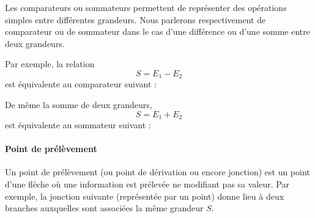 Les comparateurs ou sommateurs permettent de représenter des opérations 
simples entre différentes grandeurs.
Nous parlerons respectivement de comparateur ou de sommateur dans le cas 
d'une différence ou d'une somme entre deux grandeurs. 


Par exemple, la relation 
$$
S = E_1-E_2 
$$
est équivalente au comparateur suivant :
\begin{center}
\end{center}

De même la somme de deux grandeurs,
$$                                                                                                                            
S = E_1+E_2                                                                                                          
$$
est équivalente au sommateur suivant :
\begin{center}
\end{center}

\paragraph{Point de prélèvement}

Un point de prélèvement (ou point de dérivation ou encore jonction) 
est un point d'une flèche où une information est prélevée ne modifiant pas sa valeur.
Par exemple, la jonction suivante (représentée par un point) donne lieu à deux branches auxquelles sont
associées la même grandeur $S$.

\begin{center}
\end{center}

